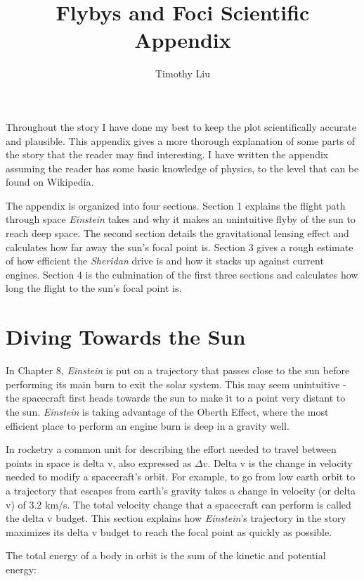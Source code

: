 \documentclass[12pt]{article} %
\title{Flybys and Foci Scientific Appendix}
\author{Timothy Liu}
\begin{document}
\maketitle

Throughout the story I have done my best to keep the plot scientifically accurate and plausible. This appendix gives a more thorough explanation of some parts of the story that the reader may find interesting. I have written the appendix assuming the reader has some basic knowledge of physics, to the level that can be found on Wikipedia.

The appendix is organized into four sections. Section 1 explains the flight path through space \textit{Einstein} takes and why it makes an unintuitive flyby of the sun to reach deep space. The second section details the gravitational lensing effect and calculates how far away the sun's focal point is. Section 3 gives a rough estimate of how efficient the \textit{Sheridan} drive is and how it stacks up against current engines. Section 4 is the culmination of the first three sections and calculates how long the flight to the sun's focal point is.

\tableofcontents

\section{Diving Towards the Sun}

In Chapter 8, \textit{Einstein} is put on a trajectory that passes close to the sun before performing its main burn to exit the solar system. This may seem unintuitive - the spacecraft first heads towards the sun to make it to a point very distant to the sun. \textit{Einstein} is taking advantage of the Oberth Effect, where the most efficient place to perform an engine burn is deep in a gravity well.

In rocketry a common unit for describing the effort needed to travel between points in space is delta v, also expressed as $\Delta v$. Delta v is the change in velocity needed to modify a spacecraft's orbit. For example, to go from low earth orbit to a trajectory that escapes from earth's gravity takes a change in velocity (or delta v) of 3.2 km/s. The total velocity change that a spacecraft can perform is called the delta v budget. This section explains how \textit{Einstein}'s trajectory in the story maximizes its delta v budget to reach the focal point as quickly as possible.

The total energy of a body in orbit is the sum of the kinetic and potential energy:
\end{document}
